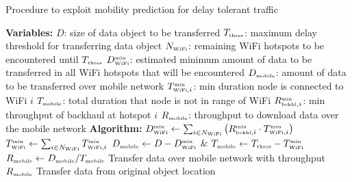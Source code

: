\documentclass{sig-alternate}
\newcommand{\mynotex}[1]{}
\begin{document}
\begin{algorithm}
\caption{Procedure to exploit mobility prediction  for delay tolerant traffic}
\begin{algorithmic}[1]
\label{alg:delaytolerant_prediction}
{\scriptsize
\STATE \textbf{Variables:}
\STATE $D$: size of data object to be transferred
\STATE $T_{\mbox{{\tiny thres}}}$: maximum delay threshold for transferring data object
\STATE $N_{\mbox{{\tiny WiFi}}}$: remaining  WiFi hotspots to be encountered until  $T_{\mbox{{\tiny thres}}}$
\STATE $D^{\mbox{{\tiny min}}}_{\mbox{{\tiny WiFi}}}$: estimated minimum amount of data to be transferred in all WiFi hotspots that will be encountered
\STATE $D_{\mbox{{\tiny mobile}}}$: amount of data  to be transferred over mobile network
\STATE $T^{\mbox{{\tiny min}}}_{\mbox{{\tiny WiFi}}, i}$: min duration node is connected  to WiFi  $i$
\STATE $T_{\mbox{{\tiny mobile}}}$: total duration that node is not in range of WiFi
\STATE $R^{\mbox{{\tiny min}}}_{\mbox{{\tiny bckhl}},i}$: min throughput of backhaul  at hotspot  $i$
\STATE $R_{\mbox{{\tiny mobile}}}$: throughput to download data over the mobile network
\STATE \textbf{Algorithm:}
\STATE  $D^{\mbox{{\tiny min}}}_{\mbox{{\tiny WiFi}}}  \leftarrow \sum_{i \in N_{\mbox{{\tiny WiFi}}}} \left ( R^{\mbox{{\tiny min}}}_{\mbox{{\tiny bckhl}}, i} \cdot T^{\mbox{{\tiny min}}}_{\mbox{{\tiny WiFi}}, i} \right )$ \label{line:dataadsl}
\STATE $T^{\mbox{{\tiny min}}}_{\mbox{{\tiny WiFi}}}  \leftarrow \sum_{i \in N_{\mbox{{\tiny WiFi}}}} T^{\mbox{{\tiny min}}}_{\mbox{{\tiny WiFi}}, i}$
\STATE  $D_{\mbox{{\tiny mobile}}} \leftarrow D-D^{\mbox{{\tiny min}}}_{\mbox{{\tiny WiFi}}}$ \& $T_{\mbox{{\tiny mobile}}} \leftarrow T_{\mbox{{\tiny thres}}}-T^{\mbox{{\tiny min}}}_{\mbox{{\tiny WiFi}}}$
\STATE $R_{\mbox{{\tiny mobile}}} \leftarrow  D_{\mbox{{\tiny mobile}}}/T_{\mbox{{\tiny mobile}}}$
\STATE Transfer data over mobile network with throughput $R_{\mbox{{\tiny mobile}}}$
\STATE Transfer data from original object location
\ENDIF
\label{line:1endb}
\\ }
\end{algorithmic}
\end{algorithm}


\mynotex{
\begin{itemize}
\item Key idea is to minimize usage mobile network while assuring that the delay constraint will be satisfied.
\item Must estimate minimum amount of data to be transferred using WiFi. Calculated mobile throughput from remaining data that needs to be transferred.
\item When switch to mobile network do two things: 1) estimate mobile throughput, 2) estimate data to cache in next wifi hotspot.
\item we assume node is connected to mobile network at all times
\item when we do not perform prefetching, the transfer throughput when node is in WiFi hotspot is lower than the throughput of WiFi due e.g. to ADSL link or because throughput for transferring from remote location is smaller
\item In case prefetching is not used, the procedure just decides the throughput to use while connected to the mobile network.
\end{itemize}

}
\end{document}
